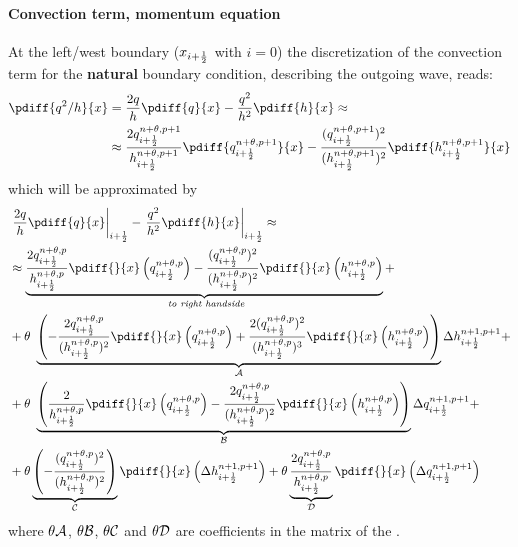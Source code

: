 \paragraph*{Convection term, momentum equation}
At the left/west boundary ($x_{i+\frac{1}{2}}$ with $i=0$) the discretization of the convection term for the \textbf{natural} boundary condition, describing the outgoing wave, reads:
\begin{align}
    \pdiff{q^2/h}{x} & = \frac{2q}{h}\pdiff{q}{x} - \frac{q^2}{h^2}\pdiff{h}{x} \approx
    \nonumber \\*
    & \approx \frac{2q^{n+\theta, p+1}_{i+\half}}{h^{n+\theta, p+1}_{i+\half}}\pdiff{q^{n+\theta, p+1}_{i+\half}}{x} - \frac{(q^{n+\theta, p+1}_{i+\half})^2}{(h^{n+\theta, p+1}_{i+\half})^2}\pdiff{h^{n+\theta, p+1}_{i+\half}}{x}
\end{align}
which will be approximated by
\begin{align}
    & \left. \frac{2q}{h}\pdiff{q}{x}\right|_{i+\half} - \left. \frac{q^2}{h^2}\pdiff{h}{x}\right|_{i+\half}
    \approx
    \\
    & \approx \underbrace{\frac{2q^{n+\theta, p}_{i+\half}}{ h^{n+\theta, p}_{i+\half}} \pdiff{}{x}\left( q^{n+\theta, p}_{i+\half} \right)
        - \frac{(q^{n+\theta, p}_{i+\half})^2}{(h^{n+\theta, p}_{i+\half})^2} \pdiff{}{x} \left( h^{n+\theta, p}_{i+\half} \right)}_{\textit{ to right handside}} +
    \nonumber \\
    &+ \theta\ \underbrace{\left( -\frac{2q^{n+\theta, p}_{i+\half}}{ (h^{n+\theta, p}_{i+\half})^2}  \pdiff{}{x} \left( q^{n+\theta,p}_{i+\half}  \right)
        + \frac{2(q^{n+\theta, p}_{i+\half})^2}{(h^{n+\theta, p}_{i+\half})^3} \pdiff{}{x} \left( h^{n+\theta,p} _{i+\half} \right)
        \right)}_{\cal A} \Delta h^{n+1, p+1}_{i+\half} +
    \nonumber \\
    &+ \theta\ \underbrace{\left( \frac{2}{ h^{n+\theta, p}_{i+\half}} \pdiff{}{x} \left( q^{n+\theta, p}_{i+\half} \right)
        -  \frac{2q^{n+\theta, p}_{i+\half}}{(h^{n+\theta, p}_{i+\half})^2} \pdiff{}{x} \left( h^{n+\theta, p}_{i+\half} \right)
        \right)}_{\cal B} \Delta q^{n+1, p+1}_{i+\half} +
    \nonumber \\
    &
    + \theta \underbrace{\left(- \frac{(q^{n+\theta, p}_{i+\half})^2}{(h^{n+\theta, p}_{i+\half})^2} \right)}_{\cal C} \pdiff{}{x} \left( \Delta h^{n+1, p+1}_{i+\half} \right)
    + \theta \underbrace{\frac{2q^{n+\theta, p}_{i+\half}}{ h^{n+\theta, p}_{i+\half}}}_{\cal D} \pdiff{}{x} \left( \Delta q^{n+1, p+1}_{i+\half} \right)
\end{align}
where $\theta\cal{A}$, $\theta\cal{B}$, $\theta\cal{C}$ and $\theta\cal{D}$ are coefficients in the matrix of the \deltaformulation.

